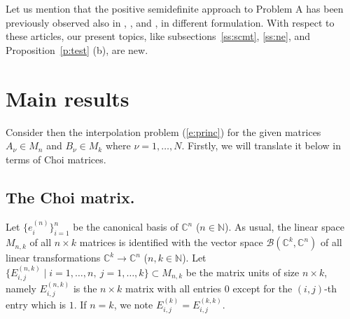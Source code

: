 \documentclass[12pt]{amsart}
\theoremstyle{definition}
\begin{document}
Let us  mention that the positive semidefinite approach to Problem A has been 
previously observed also in \cite{DArianoLoPresti}, \cite{Goncalves}, and
 \cite{hei}, in different formulation. With respect to these articles, our present topics, 
like subsections~\ref{ss:scmt}, \ref{ss:ne}, and Proposition~\ref{p:test} (b), 
are new.

\section{Main results}
\label{s:mr}

Consider then the interpolation problem (\ref{e:princ}) for the 
given matrices $A_\nu \in M_n$ and $B_\nu \in M_k$ where
$\nu =1,\ldots ,N$.
 Firstly, we will translate it below  in terms of Choi matrices.

\subsection{The Choi matrix.} \label{ss:tcm}
Let $\{e_i^{(n)}\}_{i=1}^n$ be the canonical basis of ${{\mathbb C}}^n$ ($n\in{{\mathbb N}}$).
As usual, the linear space $M_{n,k}$ of all $n\times k$ matrices is identified 
with the vector space ${{\mathcal B}}({{\mathbb C}}^k,{{\mathbb C}}^n)$  of all linear transformations 
${{\mathbb C}}^k{\rightarrow} {{\mathbb C}}^n$ ($n,k\in{{\mathbb N}}$).  Let 
$\{E_{i,j}^{(n,k)}\mid i=1,\ldots,n,\ 
j=1,\ldots,k\}\subset M_{n,k}$ be the matrix units of size $n\times k$, namely $E_{i,j}^{(n,k)}$ is the $n\times k$
matrix with all entries $0$ except for the $(i,j)$-th entry which is $1$.  
If $n=k$, we note  $E^{(k)}_{i,j}=E^{(k,k)}_{i,j}$. 
\end{document}
